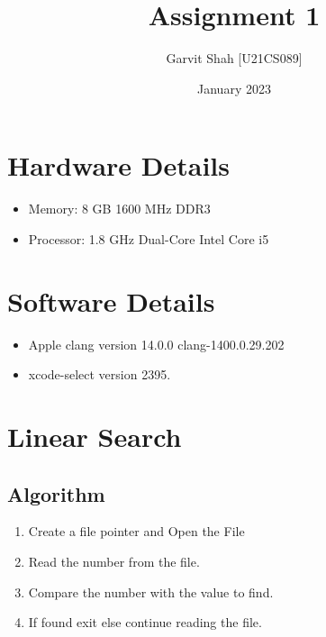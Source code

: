 \documentclass{article}
\title{Assignment 1}
\author{Garvit Shah [U21CS089]}
\date{January 2023}
\begin{document}
   \maketitle

   \section*{Hardware Details}
   \begin{itemize}
    \item Memory: 8 GB 1600 MHz DDR3
    \item Processor: 1.8 GHz Dual-Core Intel Core i5
  \end{itemize}

  \section*{Software Details}
  \begin{itemize}
   \item Apple clang version 14.0.0 clang-1400.0.29.202
   \item xcode-select version 2395.
  \end{itemize}

   \section{Linear Search}
   \subsection{Algorithm}
   \begin{enumerate}
    \item Create a file pointer and Open the File
    \item Read the number from the file.
    \item Compare the number with the value to find.
    \item If found exit else continue reading the file.
   \end{enumerate}
   
\end{document}
